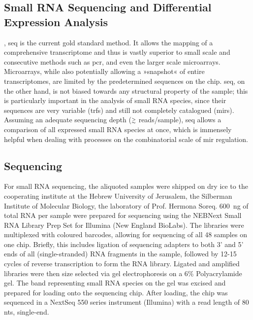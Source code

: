 \begin{method}
\section{Small RNA Sequencing and Differential Expression Analysis}
, \ac{seq} is the current gold standard method. It allows the mapping of a comprehensive transcriptome and thus is vastly superior to small scale and consecutive methods such as \ac{pcr}, and even the larger scale microarrays. Microarrays, while also potentially allowing a »snapshot« of entire transcriptomes, are limited by the predetermined sequences on the chip. \ac{seq}, on the other hand, is not biased towards any structural property of the sample; this is particularly important in the analysis of small RNA species, since their sequences are very variable (\acp{trf}) and still not completely catalogued (\acp{mir}). Assuming an adequate sequencing depth ($\smallgtrsim$ reads/sample), \ac{seq} allows a comparison of all expressed small RNA species at once, which is immensely helpful when dealing with processes on the combinatorial scale of \ac{mir} regulation.

\subsection{Sequencing} \label{sec:cellculture:sequencing}

For small RNA sequencing, the aliquoted samples were shipped on dry ice to the cooperating institute at the Hebrew University of Jerusalem, the Silberman Institute of Molecular Biology, the laboratory of Prof. Hermona Soreq. \SI{600}{\nano\gram} of total RNA per sample were prepared for sequencing using the NEBNext Small RNA Library Prep Set for Illumina (New England BioLabs). The libraries were multiplexed with coloured barcodes, allowing for sequencing of all 48 samples on one chip. Briefly, this includes ligation of sequencing adapters to both 3' and 5' ends of all (single-stranded) RNA fragments in the sample, followed by 12-15 cycles of reverse transcription to form the RNA library. Ligated and amplified libraries were then size selected via gel electrophoresis on a 6\% Polyacrylamide gel. The band representing small RNA species on the gel was excised and prepared for loading onto the sequencing chip. After loading, the chip was sequenced in a NextSeq 550 series instrument (Illumina) with a read length of 80 \acfp{nt}, single-end. 


\end{method}
